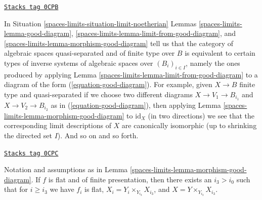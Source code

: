 \begin{remark}
\label{spaces-limits-remark-finite-type-gives-well-defined-system}
\href{https://stacks.math.columbia.edu/tag/0CPB}{\texttt{Stacks tag 0CPB}}

In Situation \ref{spaces-limits-situation-limit-noetherian}
Lemmas \ref{spaces-limits-lemma-good-diagram}, \ref{spaces-limits-lemma-limit-from-good-diagram}, and
\ref{spaces-limits-lemma-morphism-good-diagram}
tell us that the category of algebraic spaces quasi-separated and
of finite type over $B$ is equivalent to certain types of
inverse systems of algebraic spaces over $(B_i)_{i \in I}$, namely
the ones produced by applying Lemma \ref{spaces-limits-lemma-limit-from-good-diagram}
to a diagram of the form (\ref{equation-good-diagram}).
For example, given $X \to B$ finite type and quasi-separated
if we choose two different diagrams $X \to V_1 \to B_{i_1}$
and $X \to V_2 \to B_{i_2}$ as in (\ref{equation-good-diagram}), then
applying Lemma \ref{spaces-limits-lemma-morphism-good-diagram} to $\text{id}_X$
(in two directions)
we see that the corresponding limit descriptions of
$X$ are canonically isomorphic (up to shrinking the
directed set $I$). And so on and so forth.
\end{remark}

\begin{lemma}
\label{spaces-limits-lemma-morphism-good-diagram-flat}
\href{https://stacks.math.columbia.edu/tag/0CPC}{\texttt{Stacks tag 0CPC}}

Notation and assumptions as in Lemma \ref{spaces-limits-lemma-morphism-good-diagram}.
If $f$ is flat and of finite presentation, then
there exists an $i_3 > i_0$ such that for $i \geq i_3$ we have
$f_i$ is flat, $X_i = Y_i \times_{Y_{i_3}} X_{i_3}$, and
$X = Y \times_{Y_{i_3}} X_{i_3}$.
\end{lemma}

